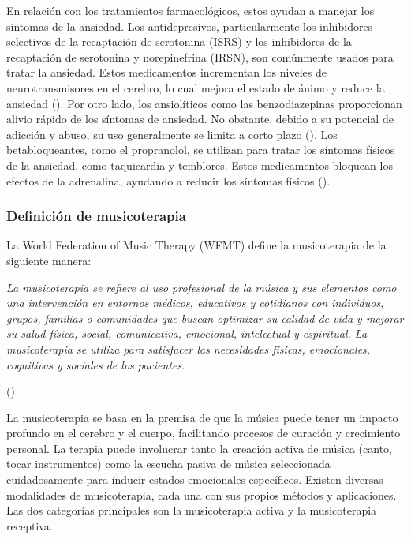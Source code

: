 En relación con los tratamientos farmacológicos, estos ayudan a manejar los síntomas de la ansiedad. Los antidepresivos, particularmente los inhibidores selectivos de la recaptación de serotonina (ISRS) y los inhibidores de la recaptación de serotonina y norepinefrina (IRSN), son comúnmente usados para tratar la ansiedad. Estos medicamentos incrementan los niveles de neurotransmisores en el cerebro, lo cual mejora el estado de ánimo y reduce la ansiedad (\cite{BALDWIN:2014}). Por otro lado, los ansiolíticos como las benzodiazepinas proporcionan alivio rápido de los síntomas de ansiedad. No obstante, debido a su potencial de adicción y abuso, su uso generalmente se limita a corto plazo (\cite{FOND:2023}). Los betabloqueantes, como el propranolol, se utilizan para tratar los síntomas físicos de la ansiedad, como taquicardia y temblores. Estos medicamentos bloquean los efectos de la adrenalina, ayudando a reducir los síntomas físicos (\cite{STEENEN:2016}).

\subsubsection{Definición de musicoterapia}

La World Federation of Music Therapy (WFMT) define la musicoterapia de la siguiente manera: 

\begin{adjustwidth}{100pt}{0pt}
\textit{La musicoterapia se refiere al uso profesional de la música y sus elementos como una intervención en entornos médicos, educativos y cotidianos con individuos, grupos, familias o comunidades que buscan optimizar su calidad de vida y mejorar su salud física, social, comunicativa, emocional, intelectual y espiritual. La musicoterapia se utiliza para satisfacer las necesidades físicas, emocionales, cognitivas y sociales de los pacientes}. \\
\begin{flushright}
	\vspace{-30px}
	(\cite{WFMT:2024})
\end{flushright}
\end{adjustwidth}

La musicoterapia se basa en la premisa de que la música puede tener un impacto profundo en el cerebro y el cuerpo, facilitando procesos de curación y crecimiento personal. La terapia puede involucrar tanto la creación activa de música (canto, tocar instrumentos) como la escucha pasiva de música seleccionada cuidadosamente para inducir estados emocionales específicos. Existen diversas modalidades de musicoterapia, cada una con sus propios métodos y aplicaciones. Las dos categorías principales son la musicoterapia activa y la musicoterapia receptiva.

